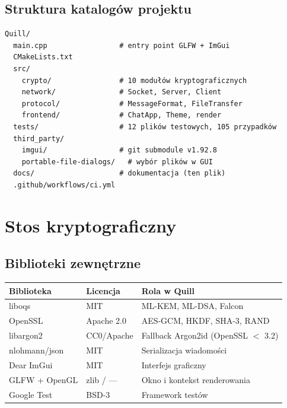 \documentclass[12pt,a4paper]{article}
\begin{document}
\subsection{Struktura katalogów projektu}

\begin{lstlisting}[style=bash,caption={Drzewo repozytorium (skrót).}]
Quill/
  main.cpp                 # entry point GLFW + ImGui
  CMakeLists.txt
  src/
    crypto/                # 10 modułów kryptograficznych
    network/               # Socket, Server, Client
    protocol/              # MessageFormat, FileTransfer
    frontend/              # ChatApp, Theme, render
  tests/                   # 12 plików testowych, 105 przypadków
  third_party/
    imgui/                 # git submodule v1.92.8
    portable-file-dialogs/   # wybór plików w GUI
  docs/                    # dokumentacja (ten plik)
  .github/workflows/ci.yml
\end{lstlisting}

\section{Stos kryptograficzny}

\subsection{Biblioteki zewnętrzne}

\begin{table}[H]
\centering
\small
\begin{tabular}{@{}p{2.8cm}p{4cm}p{6cm}@{}}
\toprule
\textbf{Biblioteka} & \textbf{Licencja} & \textbf{Rola w Quill} \\
\midrule
liboqs & MIT & ML-KEM, ML-DSA, Falcon \\
OpenSSL & Apache 2.0 & AES-GCM, HKDF, SHA-3, RAND \\
libargon2 & CC0/Apache & Fallback Argon2id (OpenSSL $<$ 3.2) \\
nlohmann/json & MIT & Serializacja wiadomości \\
Dear ImGui & MIT & Interfejs graficzny \\
GLFW + OpenGL & zlib / --- & Okno i kontekst renderowania \\
Google Test & BSD-3 & Framework testów \\
\bottomrule
\end{tabular}
\end{table}
\end{document}
